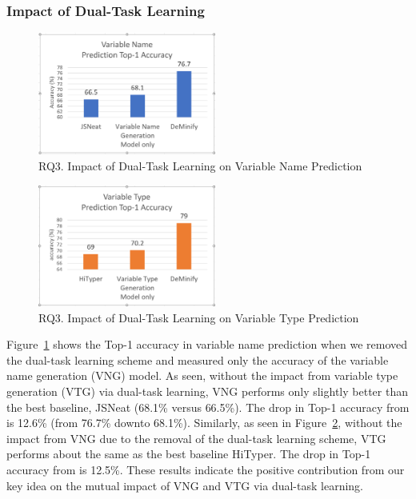 \subsubsection{Impact of Dual-Task Learning}
\label{sec:dual-task-result}


\begin{figure}[thbp]
\begin{center}
\includegraphics[width=2.3in]{figures/dual-task-result-1}
\vspace{-8pt}
\caption{RQ3. Impact of Dual-Task Learning on Variable Name Prediction}
\label{dual-task-result-1}
\end{center}
\end{figure}

\begin{figure}[thbp]
\begin{center}
\includegraphics[width=2.3in]{figures/dual-task-result-2}
\vspace{-8pt}
\caption{RQ3. Impact of Dual-Task Learning on Variable Type Prediction}
\label{dual-task-result-2}
\end{center}
\end{figure}

Figure~\ref{dual-task-result-1} shows the Top-1 accuracy in variable
name prediction when we removed the dual-task learning scheme and
measured only the accuracy of the variable name generation (VNG)
model.  As seen, without the impact from variable type generation
(VTG) via dual-task learning, VNG performs only slightly better than
the best baseline, JSNeat (68.1\% versus 66.5\%). The drop in Top-1
accuracy from {\tool} is 12.6\% (from 76.7\% downto
68.1\%). Similarly, as seen in Figure~\ref{dual-task-result-2},
without the impact from VNG due to the removal of the dual-task
learning scheme, VTG performs about the same as the best baseline
HiTyper. The drop in Top-1 accuracy from {\tool} is 12.5\%.
These results indicate the positive contribution from our key idea
on the mutual impact of VNG and VTG via dual-task learning.
